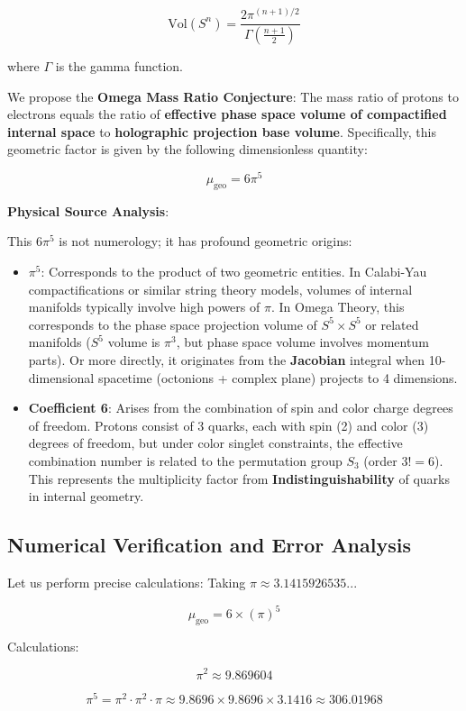 \[\text{Vol}(S^n) = \frac{2\pi^{(n+1)/2}}{\Gamma(\frac{n+1}{2})}\]

where $\Gamma$ is the gamma function.

We propose the \textbf{Omega Mass Ratio Conjecture}:
The mass ratio of protons to electrons equals the ratio of \textbf{effective phase space volume of compactified internal space} to \textbf{holographic projection base volume}.
Specifically, this geometric factor is given by the following dimensionless quantity:

\[\mu_{\text{geo}} = 6 \pi^5\]

\textbf{Physical Source Analysis}:

This $6\pi^5$ is not numerology; it has profound geometric origins:

\begin{itemize}
\item \textbf{$\pi^5$}: Corresponds to the product of two geometric entities. In Calabi-Yau compactifications or similar string theory models, volumes of internal manifolds typically involve high powers of $\pi$. In Omega Theory, this corresponds to the phase space projection volume of \textbf{$S^5 \times S^5$} or related manifolds ($S^5$ volume is $\pi^3$, but phase space volume involves momentum parts). Or more directly, it originates from the \textbf{Jacobian} integral when 10-dimensional spacetime (octonions + complex plane) projects to 4 dimensions.
\item \textbf{Coefficient 6}: Arises from the combination of spin and color charge degrees of freedom. Protons consist of 3 quarks, each with spin (2) and color (3) degrees of freedom, but under color singlet constraints, the effective combination number is related to the permutation group $S_3$ (order $3! = 6$). This represents the multiplicity factor from \textbf{Indistinguishability} of quarks in internal geometry.
\end{itemize}

\subsection{Numerical Verification and Error Analysis}

Let us perform precise calculations:
Taking $\pi \approx 3.1415926535...$

\[\mu_{\text{geo}} = 6 \times (\pi)^5\]

Calculations:

\[\pi^2 \approx 9.869604\]

\[\pi^5 = \pi^2 \cdot \pi^2 \cdot \pi \approx 9.8696 \times 9.8696 \times 3.1416 \approx 306.01968\]


